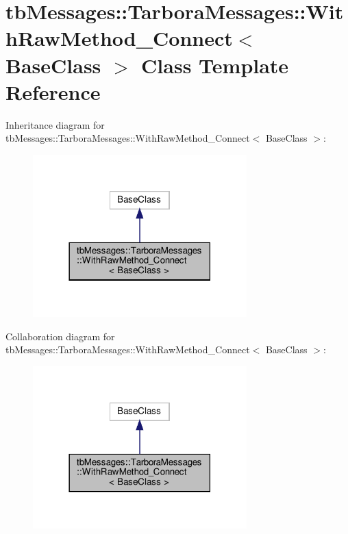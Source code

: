 \hypertarget{classtbMessages_1_1TarboraMessages_1_1WithRawMethod__Connect}{}\section{tb\+Messages\+:\+:Tarbora\+Messages\+:\+:With\+Raw\+Method\+\_\+\+Connect$<$ Base\+Class $>$ Class Template Reference}
\label{classtbMessages_1_1TarboraMessages_1_1WithRawMethod__Connect}


Inheritance diagram for tb\+Messages\+:\+:Tarbora\+Messages\+:\+:With\+Raw\+Method\+\_\+\+Connect$<$ Base\+Class $>$\+:
\nopagebreak
\begin{figure}[H]
\begin{center}
\leavevmode
\includegraphics[width=234pt]{classtbMessages_1_1TarboraMessages_1_1WithRawMethod__Connect__inherit__graph}
\end{center}
\end{figure}


Collaboration diagram for tb\+Messages\+:\+:Tarbora\+Messages\+:\+:With\+Raw\+Method\+\_\+\+Connect$<$ Base\+Class $>$\+:
\nopagebreak
\begin{figure}[H]
\begin{center}
\leavevmode
\includegraphics[width=234pt]{classtbMessages_1_1TarboraMessages_1_1WithRawMethod__Connect__coll__graph}
\end{center}
\end{figure}
